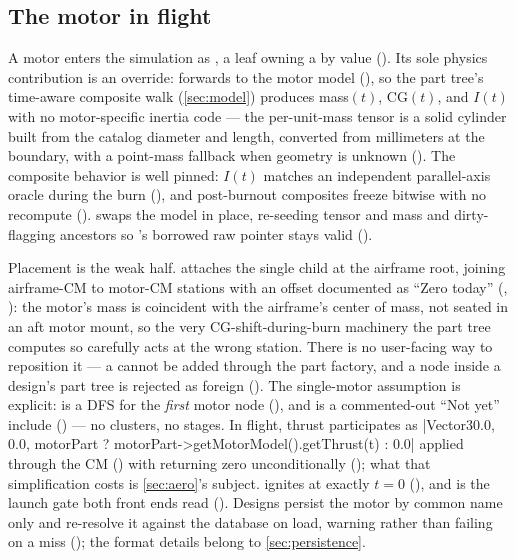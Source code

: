 \subsection{The motor in flight}\label{sec:motors-flight}

A motor enters the simulation as , a leaf  owning a
 by value (). Its sole physics contribution is an
override:  forwards to the motor model (), so the
part tree's time-aware composite walk (\cref{sec:model}) produces mass$(t)$, CG$(t)$, and $I(t)$
with no motor-specific inertia code --- the per-unit-mass tensor is a solid cylinder built from the
catalog diameter and length, converted from millimeters at the boundary, with a point-mass fallback
when geometry is unknown (). The composite behavior is well pinned:
$I(t)$ matches an independent parallel-axis oracle during the burn
(), and post-burnout composites freeze bitwise with no
recompute ().  swaps the model in place,
re-seeding tensor and mass and dirty-flagging ancestors so 's borrowed raw
pointer stays valid ().

Placement is the weak half.  attaches the single 
child at the airframe root, joining airframe-CM to motor-CM stations with an offset documented as
``Zero today'' (, ): the motor's mass
is coincident with the airframe's center of mass, not seated in an aft motor mount, so the very
CG-shift-during-burn machinery the part tree computes so carefully acts at the wrong station. There
is no user-facing way to reposition it --- a  cannot be added through the part factory,
and a  node inside a design's part tree is rejected as foreign
(). The single-motor assumption is explicit:
 is a DFS for the \emph{first} motor node (),
and  is a commented-out ``Not yet'' include () --- no
clusters, no stages. In flight, thrust participates as
\cppinline|Vector3{0.0, 0.0, motorPart ? motorPart->getMotorModel().getThrust(t) : 0.0}|
applied through the CM () with  returning zero
unconditionally (); what that simplification costs is
\cref{sec:aero}'s subject.  ignites at exactly $t=0$
(), and  is the launch gate both front ends read
(). Designs persist the motor by common name only and re-resolve it
against the database on load, warning rather than failing on a miss
(); the format details belong to \cref{sec:persistence}.

